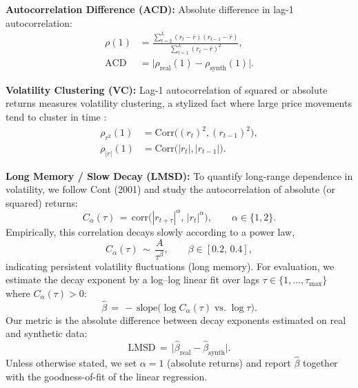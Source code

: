 \documentclass[sigconf]{acmart}
\begin{document}
          \begin{enumerate}[label=\textbf{[M\arabic*]}, resume]

          \item \label{metric:acd} \textbf{Autocorrelation Difference 
          (ACD):}  
          Absolute difference in lag-1 autocorrelation:
          \[
          \begin{aligned}
          \rho(1) &= \frac{\sum_{t=2}^{L} (r_t - \bar{r})
          (r_{t-1} - \bar{r})}
               {\sum_{t=1}^{L} (r_t - \bar{r})^2}, \\
          \mathrm{ACD} &= \big|\rho_{\text{real}}(1) - 
          \rho_{\text{synth}}(1)\big|.
          \end{aligned}
          \]
          
          \item \label{metric:volclustering} \textbf{Volatility 
          Clustering (VC):}  
          Lag-1 autocorrelation of squared or absolute returns measures 
          volatility clustering, a stylized fact where large price movements 
          tend to cluster in time \cite{Cont01}:
          \[
          \begin{aligned}
          \rho_{r^2}(1) &= \mathrm{Corr}\big((r_t)^2, 
          (r_{t-1})^2\big), \\
          \rho_{|r|}(1) &= \mathrm{Corr}\big(|r_t|, 
          |r_{t-1}|\big).
          \end{aligned}
          \]

        \item \label{metric:slow_decay} \textbf{Long Memory / Slow Decay (LMSD):}  
        To quantify long-range dependence in volatility, we follow
        Cont (2001) \cite{Cont01} and study the autocorrelation of
        absolute (or squared) returns:
        \[
        C_\alpha(\tau) \,=\, \mathrm{corr}\!\big(|r_{t+\tau}|^\alpha,\,
        |r_t|^\alpha\big), \qquad \alpha \in \{1,2\}.
        \]
        Empirically, this correlation decays slowly according to a
        power law,
        \[
        C_\alpha(\tau) \,\sim\, \frac{A}{\tau^{\beta}}, \qquad
        \beta \in [0.2,\,0.4],
        \]
        indicating persistent volatility fluctuations (long memory).
        For evaluation, we estimate the decay exponent by a
        log--log linear fit over lags 
        \(\tau \in \{1,\ldots, \tau_{\max}\}\) where
        \(C_\alpha(\tau) > 0\):
        \[
        \widehat{\beta} \,=\, -\,\text{slope}\Big(\log C_\alpha(\tau)
        \;\text{vs.}\; \log \tau\Big).
        \]
        Our metric is the absolute difference between decay exponents
        estimated on real and synthetic data:
        \[
        \mathrm{LMSD} \,=\, \big|\widehat{\beta}_{\text{real}} -
        \widehat{\beta}_{\text{synth}}\big|.
        \]
        Unless otherwise stated, we set \(\alpha=1\) (absolute returns)
        and report \(\widehat{\beta}\) together with the goodness-of-fit
        of the linear regression.
        
      \end{enumerate}
\end{document}
